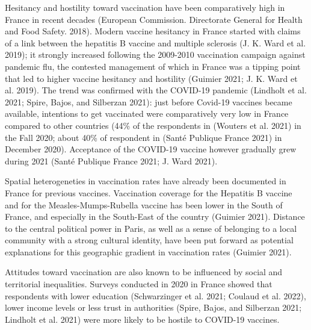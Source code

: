 \documentclass[
]{article}
\begin{document}
Hesitancy and hostility toward vaccination have been comparatively high
in France in recent decades (European Commission. Directorate General
for Health and Food Safety. 2018). Modern vaccine hesitancy in France
started with claims of a link between the hepatitis B vaccine and
multiple sclerosis (J. K. Ward et al. 2019); it strongly increased
following the 2009-2010 vaccination campaign against pandemic flu, the
contested management of which in France was a tipping point that led to
higher vaccine hesitancy and hostility (Guimier 2021; J. K. Ward et al.
2019). The trend was confirmed with the COVID-19 pandemic (Lindholt et
al. 2021; Spire, Bajos, and Silberzan 2021): just before Covid-19
vaccines became available, intentions to get vaccinated were
comparatively very low in France compared to other countries (44\% of
the respondents in (Wouters et al. 2021) in the Fall 2020; about 40\% of
respondent in (Santé Publique France 2021) in December 2020). Acceptance
of the COVID-19 vaccine however gradually grew during 2021 (Santé
Publique France 2021; J. Ward 2021).

Spatial heterogeneties in vaccination rates have already been documented
in France for previous vaccines. Vaccination coverage for the Hepatitis
B vaccine and for the Measles-Mumps-Rubella vaccine has been lower in
the South of France, and especially in the South-East of the country
(Guimier 2021). Distance to the central political power in Paris, as
well as a sense of belonging to a local community with a strong cultural
identity, have been put forward as potential explanations for this
geographic gradient in vaccination rates (Guimier 2021).

Attitudes toward vaccination are also known to be influenced by social
and territorial inequalities. Surveys conducted in 2020 in France showed
that respondents with lower education (Schwarzinger et al. 2021; Coulaud
et al. 2022), lower income levels or less trust in authorities (Spire,
Bajos, and Silberzan 2021; Lindholt et al. 2021) were more likely to be
hostile to COVID-19 vaccines.
\end{document}
